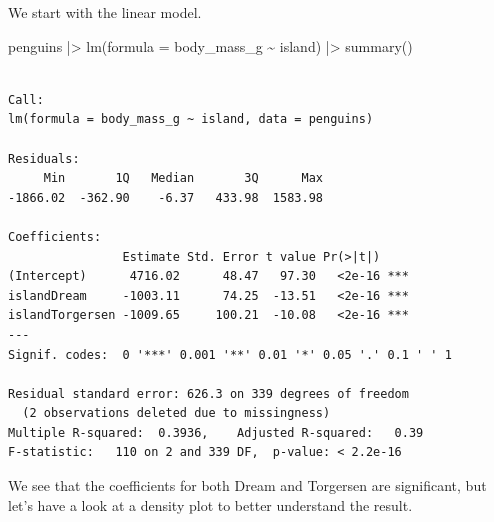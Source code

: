 \documentclass[
  letterpaper,
  DIV=11,
  numbers=noendperiod]{scrreprt}
\newenvironment{Shaded}{\begin{snugshade}}{\end{snugshade}}
\newcommand{\AttributeTok}[1]{\textcolor[rgb]{0.40,0.45,0.13}{#1}}
\newcommand{\FunctionTok}[1]{\textcolor[rgb]{0.28,0.35,0.67}{#1}}
\newcommand{\NormalTok}[1]{\textcolor[rgb]{0.00,0.23,0.31}{#1}}
\newcommand{\SpecialCharTok}[1]{\textcolor[rgb]{0.37,0.37,0.37}{#1}}
\begin{document}
We start with the linear model.

\begin{Shaded}
\begin{Highlighting}[]
\NormalTok{penguins }\SpecialCharTok{|\textgreater{}} 
  \FunctionTok{lm}\NormalTok{(}\AttributeTok{formula =}\NormalTok{ body\_mass\_g }\SpecialCharTok{\textasciitilde{}}\NormalTok{ island) }\SpecialCharTok{|\textgreater{}} 
  \FunctionTok{summary}\NormalTok{()}
\end{Highlighting}
\end{Shaded}

\begin{verbatim}

Call:
lm(formula = body_mass_g ~ island, data = penguins)

Residuals:
     Min       1Q   Median       3Q      Max 
-1866.02  -362.90    -6.37   433.98  1583.98 

Coefficients:
                Estimate Std. Error t value Pr(>|t|)    
(Intercept)      4716.02      48.47   97.30   <2e-16 ***
islandDream     -1003.11      74.25  -13.51   <2e-16 ***
islandTorgersen -1009.65     100.21  -10.08   <2e-16 ***
---
Signif. codes:  0 '***' 0.001 '**' 0.01 '*' 0.05 '.' 0.1 ' ' 1

Residual standard error: 626.3 on 339 degrees of freedom
  (2 observations deleted due to missingness)
Multiple R-squared:  0.3936,    Adjusted R-squared:   0.39 
F-statistic:   110 on 2 and 339 DF,  p-value: < 2.2e-16
\end{verbatim}

We see that the coefficients for both Dream and Torgersen are
significant, but let's have a look at a density plot to better
understand the result.
\end{document}
